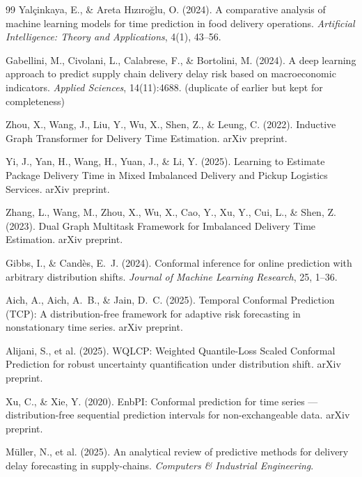 \documentclass[12pt]{article}
\begin{document}
\begin{thebibliography}{99}
Yalçinkaya, E., \& Areta Hızıroğlu, O. (2024).
A comparative analysis of machine learning models for time prediction in food delivery operations.
\emph{Artificial Intelligence: Theory and Applications}, 4(1), 43–56.

Gabellini, M., Civolani, L., Calabrese, F., \& Bortolini, M. (2024).
A deep learning approach to predict supply chain delivery delay risk based on macroeconomic indicators.
\emph{Applied Sciences}, 14(11):4688. (duplicate of earlier but kept for completeness)

Zhou, X., Wang, J., Liu, Y., Wu, X., Shen, Z., \& Leung, C. (2022).
Inductive Graph Transformer for Delivery Time Estimation.
arXiv preprint.

Yi, J., Yan, H., Wang, H., Yuan, J., \& Li, Y. (2025).
Learning to Estimate Package Delivery Time in Mixed Imbalanced Delivery and Pickup Logistics Services.
arXiv preprint.

Zhang, L., Wang, M., Zhou, X., Wu, X., Cao, Y., Xu, Y., Cui, L., \& Shen, Z. (2023).
Dual Graph Multitask Framework for Imbalanced Delivery Time Estimation.
arXiv preprint.

Gibbs, I., \& Candès, E.~J. (2024).
Conformal inference for online prediction with arbitrary distribution shifts.
\emph{Journal of Machine Learning Research}, 25, 1–36.

Aich, A., Aich, A.~B., \& Jain, D.~C. (2025).
Temporal Conformal Prediction (TCP): A distribution-free framework for adaptive risk forecasting in nonstationary time series.
arXiv preprint.

Alijani, S., et al. (2025).
WQLCP: Weighted Quantile-Loss Scaled Conformal Prediction for robust uncertainty quantification under distribution shift.
arXiv preprint.

Xu, C., \& Xie, Y. (2020).
EnbPI: Conformal prediction for time series — distribution-free sequential prediction intervals for non-exchangeable data.
arXiv preprint.

Müller, N., et al. (2025).
An analytical review of predictive methods for delivery delay forecasting in supply-chains.
\emph{Computers \& Industrial Engineering}.


\end{thebibliography}
\end{document}
